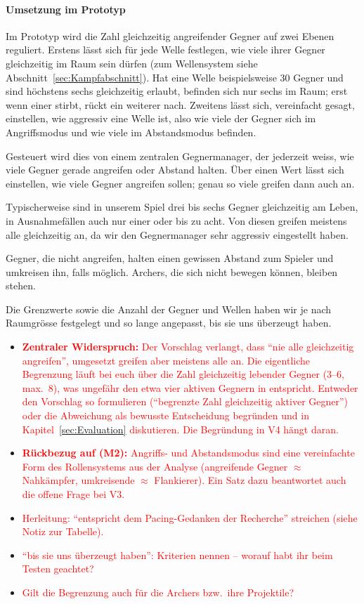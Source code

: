 \documentclass[../Main.tex]{subfiles}
\begin{document}
\paragraph{Umsetzung im Prototyp}
Im Prototyp wird die Zahl gleichzeitig angreifender Gegner auf zwei Ebenen reguliert. Erstens lässt sich für jede Welle festlegen, wie viele ihrer Gegner gleichzeitig im Raum sein dürfen (zum Wellensystem siehe Abschnitt~\ref{sec:Kampfabschnitt}). Hat eine Welle beispielsweise 30 Gegner und sind höchstens sechs gleichzeitig erlaubt, befinden sich nur sechs im Raum; erst wenn einer stirbt, rückt ein weiterer nach. Zweitens lässt sich, vereinfacht gesagt, einstellen, wie aggressiv eine Welle ist, also wie viele der Gegner sich im Angriffsmodus und wie viele im Abstandsmodus befinden.

Gesteuert wird dies von einem zentralen Gegnermanager, der jederzeit weiss, wie viele Gegner gerade angreifen oder Abstand halten. Über einen Wert lässt sich einstellen, wie viele Gegner angreifen sollen; genau so viele greifen dann auch an.

Typischerweise sind in unserem Spiel drei bis sechs Gegner gleichzeitig am Leben, in Ausnahmefällen auch nur einer oder bis zu acht. Von diesen greifen meistens alle gleichzeitig an, da wir den Gegnermanager sehr aggressiv eingestellt haben.

Gegner, die nicht angreifen, halten einen gewissen Abstand zum Spieler und umkreisen ihn, falls möglich. Archers, die sich nicht bewegen können, bleiben stehen.

Die Grenzwerte sowie die Anzahl der Gegner und Wellen haben wir je nach Raumgrösse festgelegt und so lange angepasst, bis sie uns überzeugt haben.

\begin{itemize}[leftmargin=1.5cm]
    \item \textcolor{red}{\textbf{Zentraler Widerspruch:} Der Vorschlag verlangt, dass \enquote{nie alle gleichzeitig angreifen}, umgesetzt greifen aber meistens alle an. Die eigentliche Begrenzung läuft bei euch über die Zahl gleichzeitig lebender Gegner (3--6, max.\ 8), was ungefähr den etwa vier aktiven Gegnern in  entspricht. Entweder den Vorschlag so formulieren (\enquote{begrenzte Zahl gleichzeitig aktiver Gegner}) oder die Abweichung als bewusste Entscheidung begründen und in Kapitel~\ref{sec:Evaluation} diskutieren. Die Begründung in V4 hängt daran.}
    \item \textcolor{red}{\textbf{Rückbezug auf  (M2):} Angriffs- und Abstandsmodus sind eine vereinfachte Form des Rollensystems aus der Analyse (angreifende Gegner $\approx$ Nahkämpfer, umkreisende $\approx$ Flankierer). Ein Satz dazu beantwortet auch die offene Frage bei V3.}
    \item \textcolor{red}{Herleitung: \enquote{entspricht dem Pacing-Gedanken der Recherche} streichen (siehe Notiz zur Tabelle).}
    \item \textcolor{red}{\enquote{bis sie uns überzeugt haben}: Kriterien nennen -- worauf habt ihr beim Testen geachtet?}
    \item \textcolor{red}{Gilt die Begrenzung auch für die Archers bzw.\ ihre Projektile?}
\end{itemize}
\end{document}
